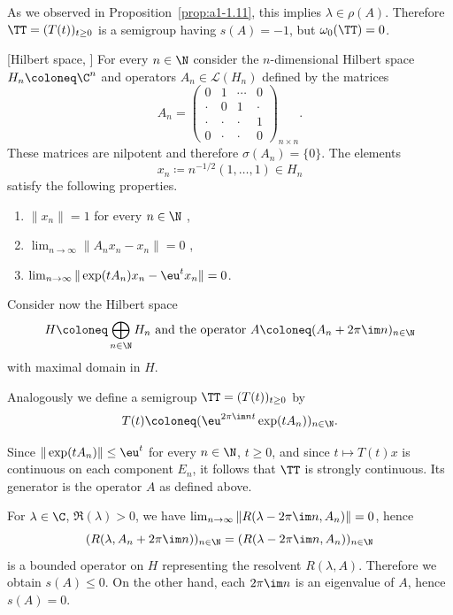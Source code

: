 As we observed in Proposition~\ref{prop:a1-1.11}, this implies $\lambda \in \rho(A)$.
Therefore $\TT = (T(t))_{t\geq 0}$ is a semigroup having $s(A) = -1$, but $\omega_{0}(\TT) = 0$.
\begin{example}\label{ex:a3-1.4}[Hilbert space, \textcite{zabczyk:1975}]
For every $n \in \N$ consider the $n$-dimensional Hilbert space $H_{n} \coloneq \C^{n}$ and operators $A_{n} \in \mathcal{L}(H_{n})$ defined by the matrices
\[
    A_{n} =
    \begin{pmatrix}
    0 & 1 & \cdots & 0 \\
    \cdot & 0 & 1 & \cdot \\
    \cdot & \cdot & \cdot & 1 \\
    0 & \cdot & \cdot & 0
    \end{pmatrix}_{n \times n} .
\]
These matrices are nilpotent and therefore $\sigma(A_{n}) = \{0\}$.
The elements 
\[
	x_{n} \coloneq n^{-1/2}(1, \ldots, 1) \in H_{n}
\]
satisfy the following properties.
\begin{enumerate}[\upshape (i)]
\item
	$\|x_{n}\| = 1$ for every $n \in \N$ , 

\item
	$\lim_{n \to \infty} \|A_{n}x_{n} - x_{n}\| = 0$ , 

\item
	$\lim_{n \to \infty} \|\exp(tA_{n})x_{n} - \eu^{t}x_{n}\| = 0$. 

\end{enumerate}
Consider now the Hilbert space 
%
\[
	\text{$H \coloneq \bigoplus_{n \in \N} H_{n}$ and the operator 
		$A \coloneq (A_{n} + 2\pi\im n)_{n \in \N}$}
\]
%
with maximal domain in $H$.

Analogously we define a semigroup $\TT = (T(t))_{t \geq 0}$ by
\[
    T(t) \coloneq (\eu^{2\pi\im nt}\exp(tA_{n}))_{n \in \N} .
\]
\end{example}
Since $\|\exp(tA_{n})\| \leq \eu^{t}$ for every $n \in \N$, $t \geq 0$, and since $t \mapsto T(t)x$ is continuous on each component $E_{n}$, it follows that $\TT$ is strongly continuous.
Its generator is the operator $A$ as defined above.

For $\lambda \in \C$, $\Re(\lambda) > 0$, we have 
$\lim_{n \to \infty} \|R(\lambda-2\pi\im n,A_{n})\| = 0$, hence
\[
    (R(\lambda,A_{n}+2\pi\im n))_{n \in \N} = (R(\lambda-2\pi\im n,A_{n}))_{n \in \N}
\]
is a bounded operator on $H$ representing the resolvent $R(\lambda,A)$.
Therefore we obtain $s(A) \leq 0$.
On the other hand, each $2\pi\im n$ is an eigenvalue of\/ $A$, hence $s(A) = 0$.

